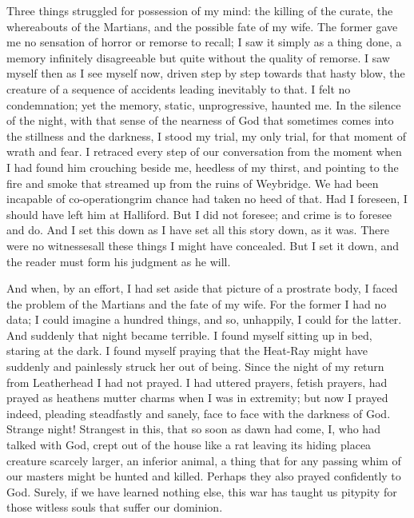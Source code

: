 Three things struggled for possession of my mind: the killing of
the curate, the whereabouts of the Martians, and the possible fate
of my wife. The former gave me no sensation of horror or remorse to
recall; I saw it simply as a thing done, a memory infinitely
disagreeable but quite without the quality of remorse. I saw myself
then as I see myself now, driven step by step towards that hasty
blow, the creature of a sequence of accidents leading inevitably to
that. I felt no condemnation; yet the memory, static,
unprogressive, haunted me. In the silence of the night, with that
sense of the nearness of God that sometimes comes into the
stillness and the darkness, I stood my trial, my only trial, for
that moment of wrath and fear. I retraced every step of our
conversation from the moment when I had found him crouching beside
me, heedless of my thirst, and pointing to the fire and smoke that
streamed up from the ruins of Weybridge. We had been incapable of
co-operation\dash{}grim chance had taken no heed of that. Had I
foreseen, I should have left him at Halliford. But I did not
foresee; and crime is to foresee and do. And I set this down as I
have set all this story down, as it was. There were no
witnesses\dash{}all these things I might have concealed. But I set it
down, and the reader must form his judgment as he will.

And when, by an effort, I had set aside that picture of a prostrate
body, I faced the problem of the Martians and the fate of my wife.
For the former I had no data; I could imagine a hundred things, and
so, unhappily, I could for the latter. And suddenly that night
became terrible. I found myself sitting up in bed, staring at the
dark. I found myself praying that the Heat-Ray might have suddenly
and painlessly struck her out of being. Since the night of my
return from Leatherhead I had not prayed. I had uttered prayers,
fetish prayers, had prayed as heathens mutter charms when I was in
extremity; but now I prayed indeed, pleading steadfastly and
sanely, face to face with the darkness of God. Strange night!
Strangest in this, that so soon as dawn had come, I, who had talked
with God, crept out of the house like a rat leaving its hiding
place\dash{}a creature scarcely larger, an inferior animal, a thing that
for any passing whim of our masters might be hunted and killed.
Perhaps they also prayed confidently to God. Surely, if we have
learned nothing else, this war has taught us pity\dash{}pity for those
witless souls that suffer our dominion.


